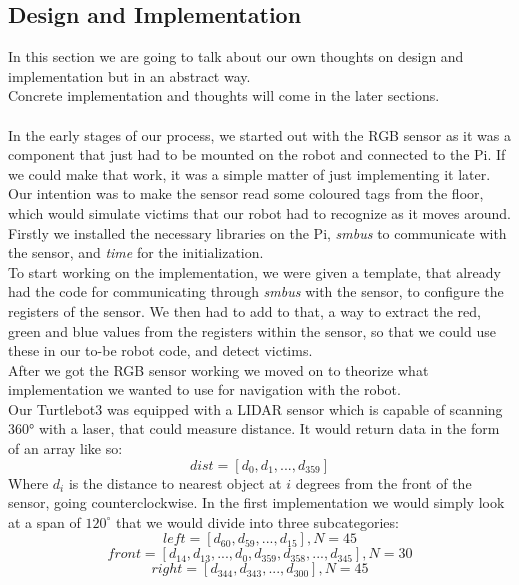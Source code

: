 \documentclass[conference]{IEEEtran}
\begin{document}
\subsection{Design and Implementation}
In this section we are going to talk about our own thoughts on design and implementation but in an abstract way.\\
Concrete implementation and thoughts will come in the later sections. \\
\vspace*{2pt}\\
In the early stages of our process, we started out with the RGB sensor as it was a component that just had to be mounted 
on the robot and connected to the Pi. If we could make that work, it was a simple matter of just implementing it later.\\
Our intention was to make the sensor read some coloured tags from the floor, which would simulate victims that our robot 
had to recognize as it moves around.\\
Firstly we installed the necessary libraries on the Pi, \textit{smbus} to communicate with the sensor, and \textit{time} for 
the initialization. \\
To start working on the implementation, we were given a template, that already had the code for communicating through 
\textit{smbus} with the sensor, to configure the registers of the sensor. We then had to add to that, a way to extract the red, 
green and blue values from the registers within the sensor, so that we could use these in our to-be robot code, and detect 
victims.\\
After we got the RGB sensor working we moved on to theorize what implementation we wanted to use for navigation with the robot.\\
Our Turtlebot3 was equipped with a LIDAR sensor which is capable of scanning 360° with a laser, that could measure distance. 
It would return data in the form of an array like so:
\[dist = \left[d_0, d_1, ..., d_{359}\right]\]
Where $d_i$ is the distance to nearest object at $i$ degrees from the front of the sensor, going counterclockwise. 
In the first implementation we would simply look at a span of $120^{\circ}$ that we would divide into three subcategories:
\[left = \left[d_{60}, d_{59}, ..., d_{15}\right], N = 45\]
\[front = \left[d_{14}, d_{13}, ..., d_0, d_{359}, d_{358}, ..., d_{345}\right], N = 30\]
\[right = \left[d_{344}, d_{343}, ..., d_{300}\right], N = 45\]
\end{document}

